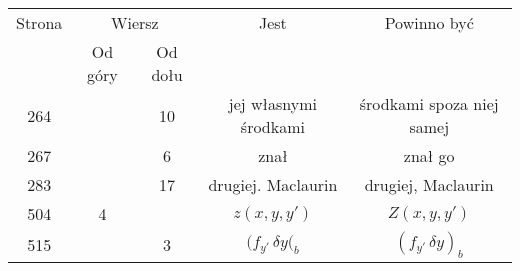 \documentclass[a4paper,11pt]{article}
\numberwithin{equation}{section}
\begin{document}



















\begin{center}

  \begin{tabular}{|c|c|c|c|c|}
    \hline
    Strona & \multicolumn{2}{c|}{Wiersz} & Jest
                              & Powinno być \\ \cline{2-3}
    & Od góry & Od dołu & & \\
    \hline
    264 & & 10 & jej własnymi środkami & środkami spoza niej samej \\
    267 & & \hphantom{0}6 & znał & znał go \\
    283 & & 17 & drugiej. Maclaurin & drugiej, Maclaurin \\
    504 & \hphantom{0}4 & & $z( x, y, y' )$ & $Z( x, y, y' )$ \\
    515 & & \hphantom{0}3 & $( f_{ y' } \, \delta y(_{ b }$
    & $( f_{ y' } \, \delta y )_{ b }$ \\
    \hline
  \end{tabular}

\end{center}

\vspace{\spaceTwo}

















\newpage
\end{document}
